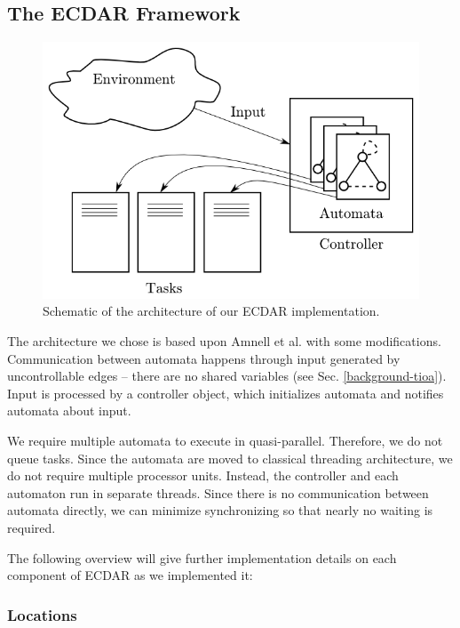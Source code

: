\subsection{The ECDAR Framework \label{implementation-framework}}

\begin{figure}
\begin{centering}
\includegraphics[scale=0.5]{images/ecdar_architecture}
\par\end{centering}

\caption{Schematic of the architecture of our ECDAR implementation.}
\end{figure}


The architecture we chose is based upon Amnell et al.\cite{amnell_code_2002}
with some modifications. Communication between automata happens through
input generated by uncontrollable edges -- there are no shared variables
(see Sec. \ref{background-tioa}). Input is processed by a controller
object, which initializes automata and notifies automata about input.

We require multiple automata to execute in quasi-parallel. Therefore,
we do not queue tasks. Since the automata are moved to classical threading
architecture, we do not require multiple processor units. Instead,
the controller and each automaton run in separate threads. Since there
is no communication between automata directly, we can minimize synchronizing
so that nearly no waiting is required.

The following overview will give further implementation details on
each component of ECDAR as we implemented it:


\subsubsection{Locations}

